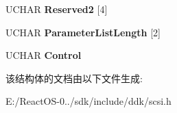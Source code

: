 \begin{DoxyCompactItemize}
U\+C\+H\+AR {\bfseries Reserved2} \mbox{[}4\mbox{]}
\item 
\mbox{\label{struct___c_d_b_1_1___p_e_r_s_i_s_t_e_n_t___r_e_s_e_r_v_e___o_u_t_a83010f8e5465c489a3b33c1695899cbc}} 
U\+C\+H\+AR {\bfseries Parameter\+List\+Length} \mbox{[}2\mbox{]}
\item 
\mbox{\label{struct___c_d_b_1_1___p_e_r_s_i_s_t_e_n_t___r_e_s_e_r_v_e___o_u_t_a4913b2e01441b6d2b5208e7214400cf7}} 
U\+C\+H\+AR {\bfseries Control}
\end{DoxyCompactItemize}


该结构体的文档由以下文件生成\+:\begin{DoxyCompactItemize}
\item 
E\+:/\+React\+O\+S-\/0../sdk/include/ddk/scsi.\+h\end{DoxyCompactItemize}
